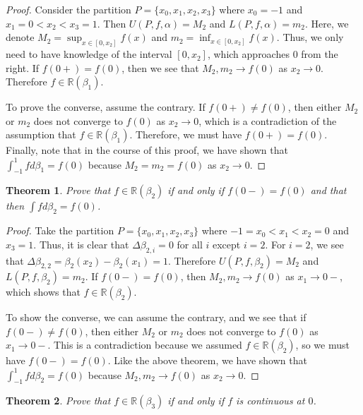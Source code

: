 \documentclass[psamsfonts]{amsart}
\newtheorem{thm}{Theorem}[section]
\theoremstyle{definition}
\theoremstyle{remark}
\numberwithin{equation}{section}
\begin{document}
\begin{proof}
Consider the partition $P = \{ x_0, x_1, x_2, x_3 \}$ where $x_0 = -1$ and $x_1 = 0 < x_2 < x_3 = 1$. Then $U(P,f,\alpha) = M_2$ and $L(P,f,\alpha) = m_2$. Here, we denote $M_2 = \sup_{x \in [0,x_2]} f(x)$ and $m_2 = \inf_{x \in [0,x_2]} f(x)$. Thus, we only need to have knowledge of the interval $[0,x_2]$, which approaches $0$ from the right. If $f(0+) = f(0)$, then we see that $M_2, m_2 \to f(0)$ as $x_2 \to 0$. Therefore $f \in \mathbb{R}(\beta_1)$. 

To prove the converse, assume the contrary. If $f(0+) \neq f(0)$, then either $M_2$ or $m_2$ does not converge to $f(0)$ as $x_2 \to 0$, which is a contradiction of the assumption that $f \in \mathbb{R}(\beta_1)$. Therefore, we must have $f(0+) = f(0)$. Finally, note that in the course of this proof, we have shown that $\int_{-1}^1 f d \beta_1 = f(0)$ because $M_2 = m_2 = f(0)$ as $x_2 \to 0$. 
\end{proof}

\begin{thm}
Prove that $f \in \mathbb{R}(\beta_2)$ if and only if $f(0-) = f(0)$ and that then $\int f d \beta_2 = f(0)$. 
\end{thm}

\begin{proof}
Take the partition $P = \{ x_0, x_1, x_2, x_3 \}$ where $-1 = x_0 < x_1 < x_2 = 0$ and $x_3 = 1$. Thus, it is clear that $\Delta \beta_{2,i} = 0$ for all $i$ except $i=2$. For $i=2$, we see that $\Delta \beta_{2,2} = \beta_{2}(x_2) - \beta_2(x_1) = 1$. Therefore $U(P,f,\beta_2) = M_2$ and $L(P,f,\beta_2) = m_2$. If $f(0-) = f(0)$, then $M_2,m_2 \to f(0)$ as $x_1 \to 0-$, which shows that $f \in \mathbb{R}(\beta_2)$. 

To show the converse, we can assume the contrary, and we see that if $f(0-) \neq f(0)$, then either $M_2$ or $m_2$ does not converge to $f(0)$ as $x_1 \to 0-$. This is a contradiction because we assumed $f \in \mathbb{R}(\beta_2)$, so we must have $f(0-) = f(0)$. Like the above theorem, we have shown that $\int_{-1}^1 f d \beta_2 = f(0)$ because $M_2, m_2 \to f(0)$ as $x_2 \to 0$.
\end{proof}

\begin{thm}
Prove that $f \in \mathbb{R}(\beta_3)$ if and only if $f$ is continuous at $0$.
\end{thm}
\end{document}
